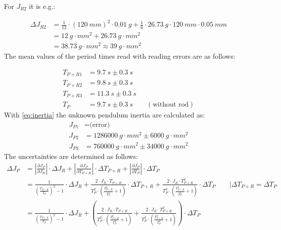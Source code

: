             For \(J_{R2}\) it is e.g.:\par
            \begin{align*}
                \Delta J_{R2}   &=\frac{1}{12}\cdot (\SI{120}{mm})^2\cdot \SI{0.01}{g} + \frac{1}{6}\cdot \SI{26.73}{g}\cdot \SI{120}{mm}\cdot \SI{0.05}{mm}\\
                                &=\SI{12}{g\cdot mm^2}+\SI{26.73}{g\cdot mm^2}\\
                                &=\SI{38.73}{g\cdot mm^2} \approx \SI{39}{g\cdot mm^2}
            \end{align*}
            The mean values of the period times read with reading errors are as follows:\par
            \begin{align}
                T_{P+R1} &=\SI{9.7}{s} \pm \SI{0.3}{s} \\
                T_{P+R2} &=\SI{9.8}{s} \pm \SI{0.3}{s} \\
                T_{P+R3} &=\SI{11.3}{s} \pm \SI{0.3}{s} \\
                T_P &=\SI{9.7}{s} \pm \SI{0.3}{s} \qquad (\text{without rod})
            \end{align}
            With \cref{eq:inertia} the unknown pendulum inertia are calculated as:
            \begin{align}
                J_{P1} &= \text{(error)} \\
                J_{P2} &= \SI{1286000}{g \cdot mm^2} \pm \SI{6000}{g \cdot mm^2} \\
                J_{P3} &= \SI{760000}{g \cdot mm^2} \pm \SI{34000}{g \cdot mm^2}
            \end{align}
            The uncertainties are determined as follows:
            \begin{align}
                \Delta J_P  &= \left| \frac{\partial J_P}{\partial J_R} \right| \cdot \Delta J_R + \left| \frac{\partial J_P}{\partial T_{P+R}} \right| \cdot \Delta T_{P+R} + \left| \frac{\partial J_P}{\partial T_P} \right| \cdot \Delta T_P \nonumber \\
                            &= \frac{1}{\left( \frac{T_{P+R}}{T_P} \right)^2-1} \cdot \Delta J_R + \frac{2 \cdot J_R \cdot T_{P+R}}{T_P^2 \cdot \left( \frac{T_{P+R}^2}{T_P^2}+1 \right)} \cdot \Delta T_{P+R} + \frac{2 \cdot J_R \cdot T_{P+R}^2}{T_P^3 \cdot \left( \frac{T_{P+R}^2}{T_P^2}+1 \right)} \cdot \Delta T_P \qquad \Big| \Delta T_{P+R} = \Delta T_P \nonumber \\
                            &= \frac{1}{\left( \frac{T_{P+R}}{T_P} \right)^2-1} \cdot \Delta J_R + \left( \frac{2 \cdot J_R \cdot T_{P+R}}{T_P^2 \cdot \left( \frac{T_{P+R}^2}{T_P^2}+1 \right)} + \frac{2 \cdot J_R \cdot T_{P+R}^2}{T_P^3 \cdot \left( \frac{T_{P+R}^2}{T_P^2}+1 \right)} \right) \cdot \Delta T_P
            \end{align}
